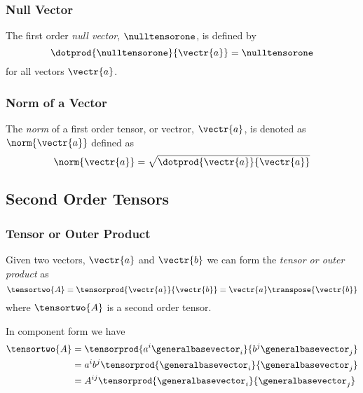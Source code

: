 \subsubsection{Null Vector}
\label{subsubsec:NullTensorFirstOrder}

The first order \emph{null vector}, $\nulltensorone$, is defined by
\begin{equation}
  \dotprod{\nulltensorone}{\vectr{a}}=\nulltensorone
  \label{eqn:DefinitionNullFirstOrder}
\end{equation}
for all vectors $\vectr{a}$.

\subsubsection{Norm of a Vector}
\label{subsubsec:NormTensorFirstOrder}

The \emph{norm} of a first order tensor, or vectror, $\vectr{a}$, is denoted as
$\norm{\vectr{a}}$ defined as
\begin{equation}
  \norm{\vectr{a}}=\sqrt{\dotprod{\vectr{a}}{\vectr{a}}}
\end{equation}

\subsection{Second Order Tensors}
\label{sec:TensorAlgebraSecondOrder}

\subsubsection{Tensor or Outer Product}
\label{subsubsec:TensorProductSecondOrder}

Given two vectors, $\vectr{a}$ and $\vectr{b}$ we can form the \emph{tensor or outer
product} as
\begin{equation}
  \tensortwo{A}=\tensorprod{\vectr{a}}{\vectr{b}}=\vectr{a}\transpose{\vectr{b}}
\end{equation}
where $\tensortwo{A}$ is a second order tensor.

In component form we have
\begin{equation}
  \begin{aligned}
    \tensortwo{A}&=\tensorprod{a^{i}\generalbasevector_{i}}{b^{j}\generalbasevector_{j}}\\
    &=a^{i}b^{j}\tensorprod{\generalbasevector_{i}}{\generalbasevector_{j}}\\
    &=A^{ij}\tensorprod{\generalbasevector_{i}}{\generalbasevector_{j}}
  \end{aligned}
\end{equation}

